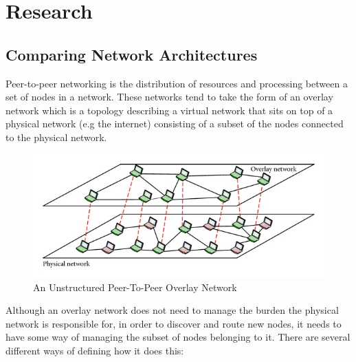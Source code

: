 \documentclass[]{report}
\begin{document}
\chapter{Research}
\section{Comparing Network Architectures}	
	Peer-to-peer networking is the distribution of resources and processing between a set of nodes in a network. These networks tend to take the form of an overlay network which is a topology describing a virtual network that sits on top of a physical network (e.g the internet) consisting of a subset of the nodes connected to the physical network.
	
	\begin{figure}[H]
		\caption{
			An Unstructured Peer-To-Peer Overlay Network 	
			\cite{Unstructured P2P Diagram}
		}
		\centering
		\includegraphics{overlaynetwork.jpg}
	\end{figure}
	
	Although an overlay network does not need to manage the burden the physical network is responsible for, in order to discover and route new nodes, it needs to have some way of managing the subset of nodes belonging to it. There are several different ways of defining how it does this:
	
\end{document}
